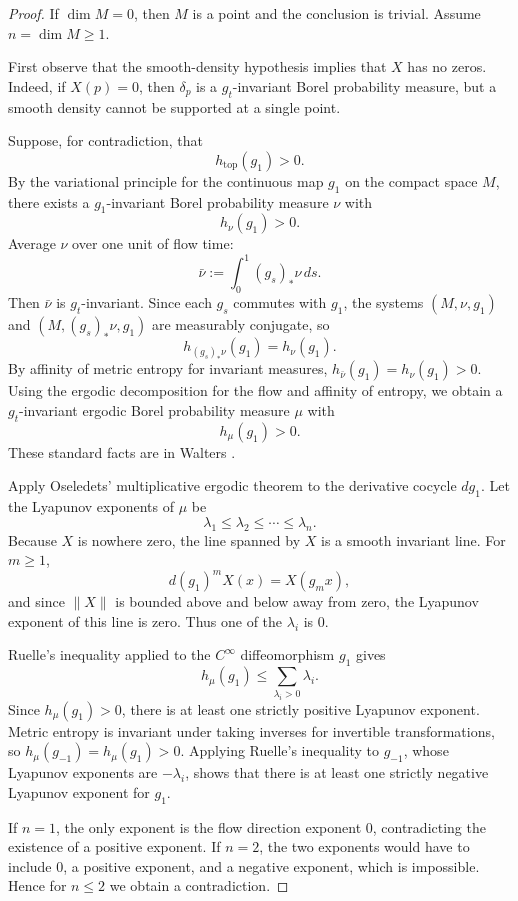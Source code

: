 \documentclass[12pt]{article}
\theoremstyle{definition}
\begin{document}
\begin{proof}
If \(\dim M=0\), then \(M\) is a point and the conclusion is trivial.  Assume \(n=\dim M\ge 1\).

First observe that the smooth-density hypothesis implies that \(X\) has no zeros.  Indeed, if \(X(p)=0\), then \(\delta_p\) is a \(g_t\)-invariant Borel probability measure, but a smooth density cannot be supported at a single point.

Suppose, for contradiction, that
\[
h_{\mathrm{top}}(g_1)>0.
\]
By the variational principle for the continuous map \(g_1\) on the compact space \(M\), there exists a \(g_1\)-invariant Borel probability measure \(\nu\) with
\[
h_\nu(g_1)>0.
\]
Average \(\nu\) over one unit of flow time:
\[
\bar\nu:=\int_0^1 (g_s)_*\nu\,ds .
\]
Then \(\bar\nu\) is \(g_t\)-invariant.  Since each \(g_s\) commutes with \(g_1\), the systems \((M,\nu,g_1)\) and \((M,(g_s)_*\nu,g_1)\) are measurably conjugate, so
\[
h_{(g_s)_*\nu}(g_1)=h_\nu(g_1).
\]
By affinity of metric entropy for invariant measures, \(h_{\bar\nu}(g_1)=h_\nu(g_1)>0\).  Using the ergodic decomposition for the flow and affinity of entropy, we obtain a \(g_t\)-invariant ergodic Borel probability measure \(\mu\) with
\[
h_\mu(g_1)>0.
\]
These standard facts are in Walters \cite[Chapters 6 and 7]{Wa82}.

Apply Oseledets' multiplicative ergodic theorem \cite{Oseledets} to the derivative cocycle \(d g_1\).  Let the Lyapunov exponents of \(\mu\) be
\[
\lambda_1\le \lambda_2\le \cdots \le \lambda_n.
\]
Because \(X\) is nowhere zero, the line spanned by \(X\) is a smooth invariant line.  For \(m\ge 1\),
\[
d(g_1)^m X(x)=X(g_m x),
\]
and since \(\|X\|\) is bounded above and below away from zero, the Lyapunov exponent of this line is zero.  Thus one of the \(\lambda_i\) is \(0\).

Ruelle's inequality \cite{Ruelle78} applied to the \(C^\infty\) diffeomorphism \(g_1\) gives
\[
h_\mu(g_1)\le \sum_{\lambda_i>0}\lambda_i .
\]
Since \(h_\mu(g_1)>0\), there is at least one strictly positive Lyapunov exponent.  Metric entropy is invariant under taking inverses for invertible transformations, so \(h_\mu(g_{-1})=h_\mu(g_1)>0\).  Applying Ruelle's inequality to \(g_{-1}\), whose Lyapunov exponents are \(-\lambda_i\), shows that there is at least one strictly negative Lyapunov exponent for \(g_1\).

If \(n=1\), the only exponent is the flow direction exponent \(0\), contradicting the existence of a positive exponent.  If \(n=2\), the two exponents would have to include \(0\), a positive exponent, and a negative exponent, which is impossible.  Hence for \(n\le 2\) we obtain a contradiction.


\end{proof}
\end{document}
